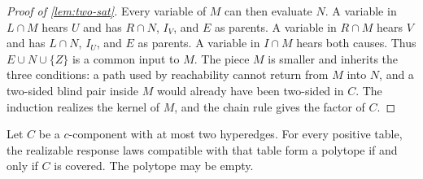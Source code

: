 \begin{proof}[Proof of \cref{lem:two-sat}]
Every variable of $M$ can then evaluate $N$. A variable in $L\cap M$ hears $U$ and has $R\cap N$, $I_V$, and $E$ as parents. A variable in $R\cap M$ hears $V$ and has $L\cap N$, $I_U$, and $E$ as parents. A variable in $I\cap M$ hears both causes. Thus $E\cup N\cup\{Z\}$ is a common input to $M$. The piece $M$ is smaller and inherits the three conditions: a path used by reachability cannot return from $M$ into $N$, and a two-sided blind pair inside $M$ would already have been two-sided in $C$. The induction realizes the kernel of $M$, and the chain rule gives the factor of $C$.
\end{proof}

\begin{lemma}[Covering]
\label{lem:cover}
Let $C$ be a $c$-component with at most two hyperedges. For every positive table, the realizable response laws compatible with that table form a polytope if and only if $C$ is covered. The polytope may be empty.
\end{lemma}

